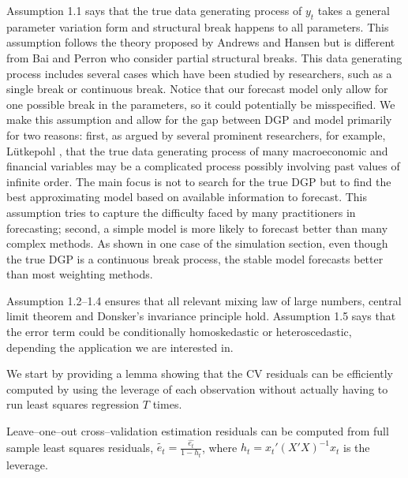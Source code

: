 \documentclass[a4paper,12pt]{article}
\begin{document}
Assumption 1.1 says that the true data generating process of $y_t$ takes a general parameter variation form and structural break happens to all parameters. This assumption follows the theory proposed by Andrews and Hansen but is different from Bai and Perron who consider partial structural breaks. This data generating process includes several cases which have been studied by researchers, such as a single break or continuous break. Notice that our forecast model only allow for one possible break in the parameters, so it could potentially be misspecified. We make this assumption and allow for the gap between DGP and model primarily for two reasons: first, as argued by several prominent researchers, for example, L\"{u}tkepohl \cite{lutkepohl_textbook}, that the true data generating process of many macroeconomic and financial variables may be a complicated process possibly involving past values of infinite order. The main focus is not to search for the true DGP but to find the best approximating model based on available information to forecast. This assumption tries to capture the difficulty faced by many practitioners in forecasting; second, a simple model is more likely to forecast better than many complex methods. As shown in one case of the simulation section, even though the true DGP is a continuous break process, the stable model forecasts better than most weighting methods.

Assumption 1.2--1.4 ensures that all relevant mixing law of large numbers, central limit theorem and Donsker's invariance principle hold. Assumption 1.5 says that the error term could be conditionally homoskedastic or heteroscedastic, depending the application we are interested in.

We start by providing a lemma showing that the CV residuals can be efficiently computed by using the leverage of each observation without actually having to run least squares regression $T$ times.
\begin{lemma} \label{lem:1}
Leave--one--out cross--validation estimation residuals can be computed from full sample least squares residuals, $\tilde{e_t} = \frac{\hat{e_t}}{1-h_t}$, where $h_t = x_t' (X'X)^{-1} x_t$ is the leverage.
\end{lemma}
\end{document}
